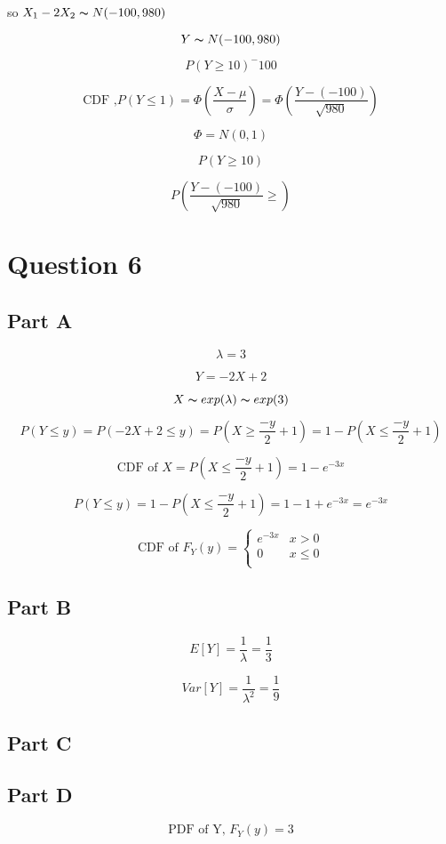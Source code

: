 \documentclass[letterpaper]{article}
\begin{document}
so $X_1 -2X_2 \thicksim N(-100, 980)$

$$Y \thicksim N(-100, 980)$$

$$P(Y \geq 10)^-100$$

$$\text{CDF ,} P(Y \leq 1) = \Phi(\frac{X-\mu}{\sigma}) = \Phi(\frac{Y-(-100)}{\sqrt{980}})$$

$$\Phi = N(0,1)$$

$$P(Y \geq 10)$$

$$P(\frac{Y-(-100)}{\sqrt{980}} \geq )$$

\newpage

\section*{Question 6}

\subsection*{Part A}

$$\lambda = 3$$

$$Y = -2X + 2$$

$$X \thicksim exp(\lambda) \thicksim exp(3)$$

$$P(Y \leq y) = P(-2X + 2 \leq y) = P(X \geq \frac{-y}{2} + 1) = 1 - P(X \leq \frac{-y}{2} + 1)$$

$$\text{CDF of } X = P(X \leq \frac{-y}{2} + 1) = 1 - e^{-3x}$$

$$P(Y \leq y) = 1 - P(X \leq \frac{-y}{2} + 1) = 1 - 1 + e^{-3x} = e^{-3x}$$

$$\text{CDF of } F_Y(y) = \begin{cases}
    e^{-3x}    &      x > 0      \\
    0               &     x \leq 0   \\
\end{cases}$$

\subsection*{Part B}

$$E[Y] = \frac{1}{\lambda} = \frac{1}{3}$$

$$Var[Y] = \frac{1}{\lambda^2} = \frac{1}{9}$$

\subsection*{Part C}

\subsection*{Part D}

$$\text{PDF of Y, } F_Y(y) = 3$$
\end{document}
